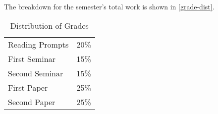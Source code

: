 \documentclass[titlepage]{article}
\newcommand\policy{../policy}
\begin{document}
The breakdown for the semester's total work is shown in
\autoref{grade-dist}.

\begin{table}[htbp]
  \centering
  {\lining
  \begin{tabular}{lr}
    \toprule
    Reading Prompts & 20\% \\
    First Seminar   & 15\% \\
    Second Seminar  & 15\% \\
    First Paper     & 25\% \\
    Second Paper    & 25\% \\
    \bottomrule
  \end{tabular}}
  \caption{Distribution of Grades}
  \label{grade-dist}
\end{table}



\end{document}
